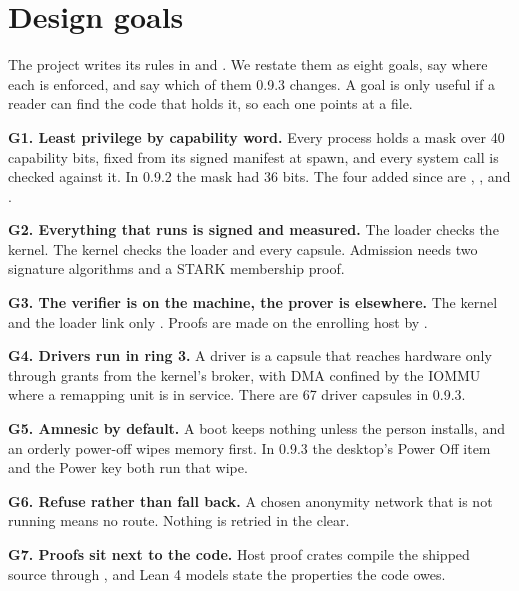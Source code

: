 \section{Design goals}\label{sec:goals}

The project writes its rules in  and . We restate them as eight goals, say where each is enforced, and say which of them 0.9.3 changes. A goal is only useful if a reader can find the code that holds it, so each one points at a file.

\textbf{G1. Least privilege by capability word.} Every process holds a mask over 40 capability bits, fixed from its signed manifest at spawn, and every system call is checked against it. In 0.9.2 the mask had 36 bits. The four added since are , ,  and .

\textbf{G2. Everything that runs is signed and measured.} The loader checks the kernel. The kernel checks the loader and every capsule. Admission needs two signature algorithms and a STARK membership proof.

\textbf{G3. The verifier is on the machine, the prover is elsewhere.} The kernel and the loader link only . Proofs are made on the enrolling host by .

\textbf{G4. Drivers run in ring 3.} A driver is a capsule that reaches hardware only through grants from the kernel's broker, with DMA confined by the IOMMU where a remapping unit is in service. There are 67 driver capsules in 0.9.3.

\textbf{G5. Amnesic by default.} A boot keeps nothing unless the person installs, and an orderly power-off wipes memory first. In 0.9.3 the desktop's Power Off item and the Power key both run that wipe.

\textbf{G6. Refuse rather than fall back.} A chosen anonymity network that is not running means no route. Nothing is retried in the clear.

\textbf{G7. Proofs sit next to the code.} Host proof crates compile the shipped source through \code{\#[path]}, and Lean 4 models state the properties the code owes.

